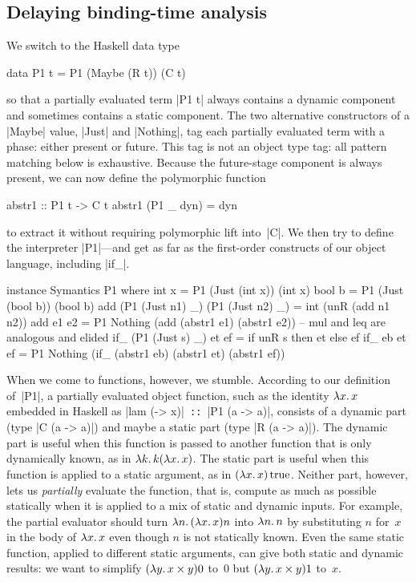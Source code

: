 \subsection{Delaying binding-time analysis}
\label{S:PE-problem}

We switch to the Haskell data type
\begin{code}
data P1 t = P1 (Maybe (R t)) (C t)
\end{code}
so that a partially evaluated term |P1 t| always contains a dynamic
component and sometimes contains a static component.  The two
alternative constructors of a |Maybe| value, |Just| and |Nothing|,
tag each partially evaluated term with a phase: either present or
future.  This tag is not an object type tag: all pattern matching below
is exhaustive.  Because the future-stage component is always present, we
can now define the polymorphic function
\begin{code}
abstr1 :: P1 t -> C t
abstr1 (P1 _ dyn) = dyn
\end{code}
to extract it without requiring polymorphic lift into~|C|.  We then try
to define the interpreter |P1|---and get as far as the first-order
constructs of our object language, including |if_|.
\begin{code}
instance Symantics P1 where
  int  x = P1 (Just (int x)) (int x)
  bool b = P1 (Just (bool b)) (bool b)
  add (P1 (Just n1) _) (P1 (Just n2) _)
    = int (unR (add n1 n2))
  add e1 e2 = P1 Nothing (add (abstr1 e1) (abstr1 e2))
  -- mul and leq are analogous and elided
  if_ (P1 (Just s) _) et ef = if unR s then et else ef
  if_ eb et ef = P1 Nothing
    (if_ (abstr1 eb) (abstr1 et) (abstr1 ef))
\end{code}

When we come to functions, however, we stumble.  According to our
definition of~|P1|, a partially evaluated object function, such as the
identity $\mathopen{\lambda\mathord{x}.\,}x$ embedded in Haskell as |lam (\x -> x)|\texttt{ ::
}|P1 (a -> a)|, consists of a dynamic part (type |C (a -> a)|) and
maybe a static part (type |R (a -> a)|).  The dynamic part is useful
when this function is passed to another function that is only
dynamically known, as in $\mathopen{\lambda\mathord{k}.\,}k(\mathopen{\lambda\mathord{x}.\,}x)$.  The static part is
useful when this function is applied to a static argument, as in
$(\mathopen{\lambda\mathord{x}.\,}x)\mathinner{\mathrm{true}}$.  Neither part, however, lets us \emph{partially}
evaluate the function, that is, compute as much as possible statically
when it is applied to a mix of static and dynamic inputs.  For example,
the partial evaluator should turn $\mathopen{\lambda\mathord{n}.\,}(\mathopen{\lambda\mathord{x}.\,}x)n$ into $\mathopen{\lambda\mathord{n}.\,}n$
by substituting $n$ for~$x$ in the body of $\mathopen{\lambda\mathord{x}.\,}x$ even though $n$ is
not statically known.  Even the same static function, applied to
different static arguments, can give both static and dynamic results: we
want to simplify $(\mathopen{\lambda\mathord{y}.\,}x\times y)0$ to~$0$ but $(\mathopen{\lambda\mathord{y}.\,}x\times y)1$
to~$x$.

